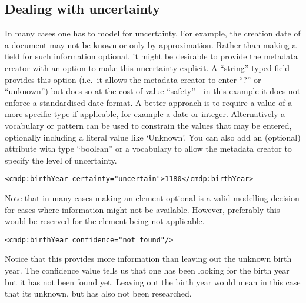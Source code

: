 \subsection{Dealing with uncertainty}\label{dealing-with-uncertainty}

In many cases one has to model for uncertainty. For example, the
creation date of a document may not be known or only by approximation.
Rather than making a field for such information optional, it might be
desirable to provide the metadata creator with an option to make this
uncertainty explicit. A ``string'' typed field provides this option
(i.e.~it allows the metadata creator to enter ``?'' or ``unknown'') but
does so at the cost of value ``safety'' - in this example it does not
enforce a standardised date format. A better approach is to require a
value of a more specific type if applicable, for example a date or
integer. Alternatively a vocabulary or pattern can be used to constrain
the values that may be entered, optionally including a literal value
like `Unknown'. You can also add an (optional) attribute with type
``boolean'' or a vocabulary to allow the metadata creator to specify the
level of uncertainty.

\begin{verbatim}
<cmdp:birthYear certainty="uncertain">1180</cmdp:birthYear>
\end{verbatim}

Note that in many cases making an element optional is a valid modelling
decision for cases where information might not be available. However,
preferably this would be reserved for the element being not applicable.

\begin{verbatim}
<cmdp:birthYear confidence="not found"/>
\end{verbatim}

Notice that this provides more information than leaving out the unknown
birth year. The confidence value tells us that one has been looking for
the birth year but it has not been found yet. Leaving out the birth year
would mean in this case that its unknown, but has also not been
researched.
